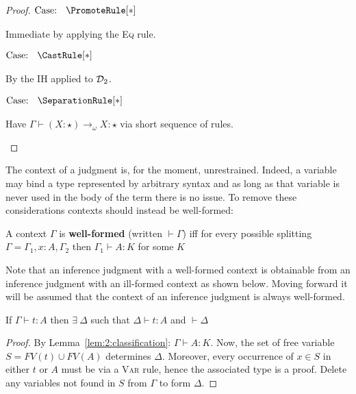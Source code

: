 \begin{proof}
    $\text{Case: }\begin{array}{c} \PromoteRule[*] \end{array}$
    \begin{proofcase}
        Immediate by applying the \textsc{Eq} rule.
    \end{proofcase}

    $\text{Case: }\begin{array}{c} \CastRule[*] \end{array}$
    \begin{proofcase}
        By the IH applied to $\mathcal{D}_{2}$.
    \end{proofcase}

    $\text{Case: }\begin{array}{c} \SeparationRule[*] \end{array}$
    \begin{proofcase}
        Have $\Gamma \vdash (X : \star) \to_\omega X : \star$ via short sequence of rules.
    \end{proofcase}
\end{proof}

The context of a judgment is, for the moment, unrestrained.
Indeed, a variable may bind a type represented by arbitrary syntax and as long as that variable is never used in the body of the term there is no issue.
To remove these considerations contexts should instead be well-formed:
\begin{definition}
    A context $\Gamma$ is \textbf{well-formed} (written $\vdash \Gamma$) iff for every possible splitting $\Gamma = \Gamma_1, x : A, \Gamma_2$ then $\Gamma_1 \vdash A : K$ for some $K$
\end{definition}
Note that an inference judgment with a well-formed context is obtainable from an inference judgment with an ill-formed context as shown below.
Moving forward it will be assumed that the context of an inference judgment is always well-formed.
\begin{lemma}
    If $\Gamma \vdash t : A$ then $\exists\ \Delta$ such that $\Delta \vdash t : A$ and $\vdash \Delta$
\end{lemma}
\begin{proof}
    By Lemma~\ref{lem:2:classification}: $\Gamma \vdash A : K$.
    Now, the set of free variable $S = FV(t) \cup FV(A)$ determines $\Delta$.
    Moreover, every occurrence of $x \in S$ in either $t$ or $A$ must be via a \textsc{Var} rule, hence the associated type is a proof.
    Delete any variables not found in $S$ from $\Gamma$ to form $\Delta$.
\end{proof}
